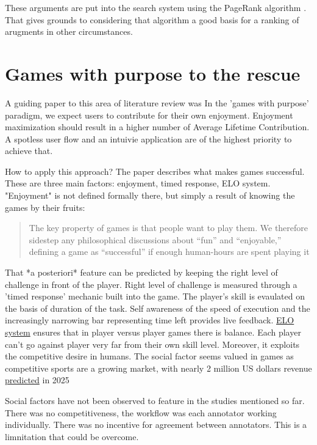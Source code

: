 \documentclass{report}
\begin{document}
These arguments are put into the search system using the PageRank algorithm \cite{brin_anatomy_1998}.  That gives grounds to considering that algorithm a good basis for a ranking of arugments in other circumstances.

\section{Games with purpose to the rescue}
A guiding paper to this area of literature review was \cite{von_ahn_designing_2008} 
In the 'games with purpose' paradigm, we expect users to contribute for their own enjoyment. Enjoyment maximization should result in a higher number of Average Lifetime Contribution.  A spotless user flow and an intuivie application are of the highest priority to achieve that.

How to apply this approach? The paper describes what makes games successful.
These are three main factors: enjoyment, timed response, ELO system.
"Enjoyment" is not defined formally there, but simply a result of knowing the games by their fruits:

\begin{quote}
 The key property of games is that people want to play them. We therefore sidestep any philosophical discussions about “fun” and “enjoyable,” defining a game as “successful” if enough human-hours are spent playing it
\end{quote}
That  *a posteriori* feature can be predicted by keeping the right level of challenge in front of the player.  \cite{locke_theory_1991}
Right level of challenge is measured through a 'timed response' mechanic built into the game.
The player's skill is evaulated on the basis of duration of the task. 
Self awareness of the speed of execution and the increasingly narrowing bar representing time left provides live feedback.
\href{https://en.wikipedia.org/wiki/Elo_rating_system}{ELO system} ensures that in player versus player games there is balance. Each player can't go against player very far from their own skill level.
Moreover, it exploits the competitive desire in humans.
The social factor seems valued in games as competitive sports are a growing market, with nearly 2 million US dollars revenue \href{https://www.statista.com/statistics/490522/global-esports-market-revenue/}{predicted} in 2025

Social factors have not been observed to feature in the studies mentioned so far.
There was no competitiveness, the workflow was each annotator working individually.
There was no incentive for agreement between annotators.
This is a limnitation that could be overcome.
\end{document}
